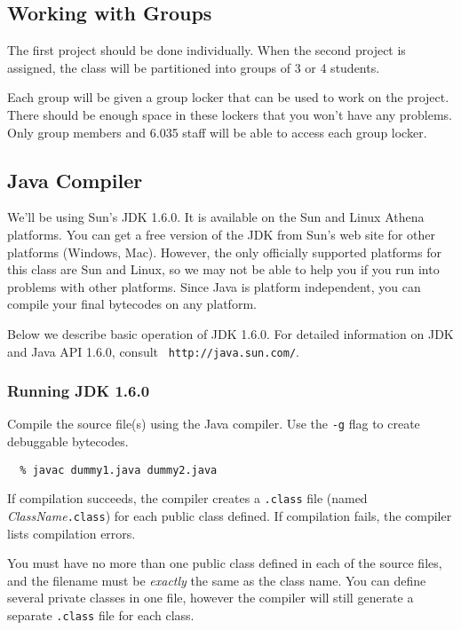 \subsection*{Working with Groups}

The first project should be done individually.  When the second project is
assigned, the class will be partitioned into groups of 3 or 4 students.

Each group will be given a group locker that can be used to work on
the project.  There should be enough space in these lockers that you
won't have any problems.  Only group members and 6.035 staff will
be able to access each group locker.

\subsection*{Java Compiler}

We'll be using Sun's JDK 1.6.0. It is available on the Sun
and Linux Athena platforms.  You can get a free version of the JDK
from Sun's web site for other platforms (Windows, Mac).  However, the
only officially supported platforms for this class are Sun and Linux,
so we may not be able to help you if you run into problems with other
platforms.  Since Java is platform independent, you can compile your
final bytecodes on any platform.

Below we describe basic operation of JDK 1.6.0.  For detailed
information on JDK and Java API 1.6.0, consult {\tt
http://java.sun.com/}.

\subsubsection*{Running JDK 1.6.0}

Compile the source file(s) using the Java compiler. Use the {\tt -g}
flag to create debuggable bytecodes.

\begin{verbatim}
  % javac dummy1.java dummy2.java
\end{verbatim}

If compilation succeeds, the compiler creates a {\tt .class} file
(named {\it ClassName}{\tt.class}) for each public class defined.  If
compilation fails, the compiler lists compilation errors.

You must have no more than one public class defined in each of the
source files, and the filename must be {\em exactly} the same as the
class name.  You can define several private classes in one file,
however the compiler will still generate a separate {\tt .class} file
for each class.

